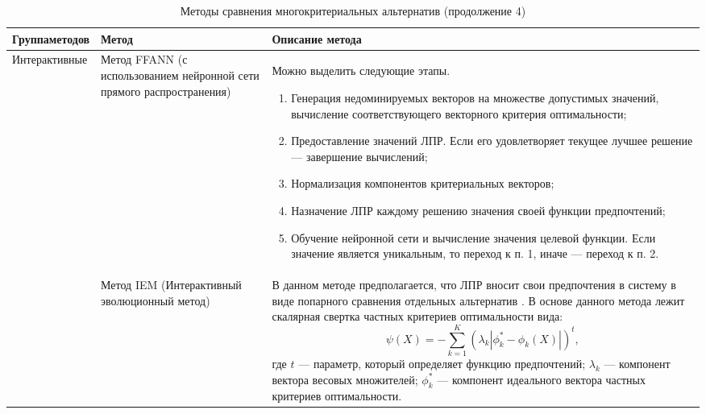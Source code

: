 \begin{table}[H]
	\centering
	\caption{Методы сравнения многокритериальных альтернатив (продолжение 4)}
	\label{mko_table_4}
	\begin{tabular}{|p{3.3cm}|p{2.4cm}|p{9.5cm}|}
		\hline
		\textbf{Группа\linebreak методов} & \textbf{Метод} & \textbf{Описание метода} \\
		\hline
		\multirow{2}{3.3cm}{Интерактивные} & Метод FFANN (с использованием нейронной сети прямого распространения) & Можно выделить следующие этапы.
		\begin{enumerate}
			\item Генерация недоминируемых векторов на множестве допустимых значений, вычисление соответствующего векторного критерия оптимальности;
			\item Предоставление значений ЛПР. Если его удовлетворяет текущее лучшее решение --- завершение вычислений;
			\item Нормализация компонентов критериальных векторов;
			\item Назначение ЛПР каждому решению значения своей функции предпочтений;
			\item Обучение нейронной сети и вычисление значения целевой функции. Если значение является уникальным, то переход к п. 1, иначе --- переход к п. 2.
		\end{enumerate}\\
		\cline{2-3} & Метод IEM (Интерактивный эволюционный метод) & В данном методе предполагается, что ЛПР вносит свои предпочтения в систему в виде попарного сравнения отдельных альтернатив \cite{pareto}. В основе данного метода лежит скалярная свертка частных критериев оптимальности вида:
		\begin{equation}
			\psi(X) = -\sum_{k=1}^{K}(\lambda_{k}|\phi_{k}^* - \phi_{k}(X)|)^t,
		\end{equation}
		где $t$ --- параметр, который определяет функцию предпочтений; $\lambda_{k}$ --- компонент вектора весовых множителей; $\phi_{k}^*$ --- компонент идеального вектора частных критериев оптимальности.\\
		\hline
	\end{tabular}
\end{table}

